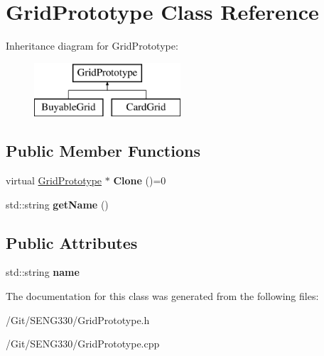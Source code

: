 \hypertarget{class_grid_prototype}{}\section{Grid\+Prototype Class Reference}
\label{class_grid_prototype}
Inheritance diagram for Grid\+Prototype\+:\begin{figure}[H]
\begin{center}
\leavevmode
\includegraphics[height=2.000000cm]{class_grid_prototype}
\end{center}
\end{figure}
\subsection*{Public Member Functions}
\begin{DoxyCompactItemize}
\item 
\hypertarget{class_grid_prototype_a6f2ca97d6e312502e3e0f450aedbd0a0}{}virtual \hyperlink{class_grid_prototype}{Grid\+Prototype} $\ast$ {\bfseries Clone} ()=0\label{class_grid_prototype_a6f2ca97d6e312502e3e0f450aedbd0a0}

\item 
\hypertarget{class_grid_prototype_a6224c8cb852c9588a0a5e7c0f786e8ec}{}std\+::string {\bfseries get\+Name} ()\label{class_grid_prototype_a6224c8cb852c9588a0a5e7c0f786e8ec}

\end{DoxyCompactItemize}
\subsection*{Public Attributes}
\begin{DoxyCompactItemize}
\item 
\hypertarget{class_grid_prototype_a395589b735e018d0cd7b27b73d09436c}{}std\+::string {\bfseries name}\label{class_grid_prototype_a395589b735e018d0cd7b27b73d09436c}

\end{DoxyCompactItemize}


The documentation for this class was generated from the following files\+:\begin{DoxyCompactItemize}
\item 
/\+Git/\+S\+E\+N\+G330/Grid\+Prototype.\+h\item 
/\+Git/\+S\+E\+N\+G330/Grid\+Prototype.\+cpp\end{DoxyCompactItemize}
